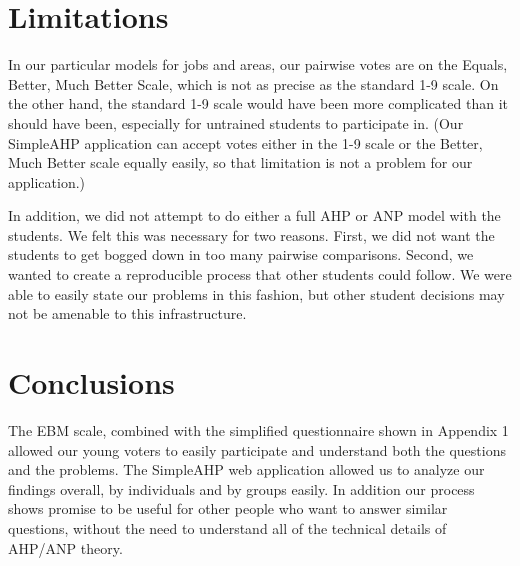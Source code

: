 \documentclass[11pt]{article}
\begin{document}

\section{Limitations}
In our particular models for jobs and areas, our pairwise votes are on the Equals, Better, Much Better Scale, which is not as precise as the standard 1-9 scale.  On the other hand, the standard 1-9 scale would have been more complicated than it should have been, especially for untrained students to participate in.
(Our SimpleAHP application can accept votes either in the 1-9 scale or the Better, Much Better scale equally easily, so that limitation is not a problem for our application.)

In addition, we did not attempt to do either a full AHP or ANP model with
the students.  We felt this was necessary for two reasons.  First, we did not
want the students to get bogged down in too many pairwise comparisons.  Second, we
wanted to create a reproducible process that other students could follow.  We were
able to easily state our problems in this fashion, but other student decisions may
not be amenable to this infrastructure.

\section{Conclusions}
The EBM scale, combined with the simplified questionnaire shown in Appendix 1
allowed our young voters to easily participate and understand both the 
questions and the
problems.  The SimpleAHP web application allowed us to analyze our findings overall, by
individuals and by groups easily.  In addition our process shows promise
to be useful for
other people who want to answer similar questions, without the need to 
understand all of the
technical details of AHP/ANP theory.
\end{document}
